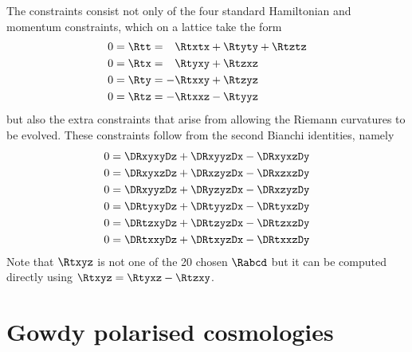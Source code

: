 \documentclass[a4paper,12pt]{article}
\numberwithin{equation}{section}
\begin{document}
The constraints consist not only of the four standard Hamiltonian and momentum constraints,
which on a lattice take the form
\begin{align}
0 &= \Rtt = \phantom{-} \Rtxtx + \Rtyty + \Rtztz\label{eqn:EinsConstA}\\
0 &= \Rtx = \phantom{-} \Rtyxy + \Rtzxz\label{eqn:EinsConstB}\\
0 &= \Rty = - \Rtxxy + \Rtzyz\label{eqn:EinsConstC}\\
0 &= \Rtz = - \Rtxxz - \Rtyyz\label{eqn:EinsConstD}
\end{align}
but also the extra constraints that arise from allowing the Riemann curvatures to be
evolved. These constraints follow from the second Bianchi identities, namely
\begin{align}
0 &= \DRxyxyDz + \DRxyyzDx - \DRxyxzDy\label{eqn:BianConstA}\\
0 &= \DRxyxzDz + \DRxzyzDx - \DRxzxzDy\label{eqn:BianConstB}\\
0 &= \DRxyyzDz + \DRyzyzDx - \DRxzyzDy\label{eqn:BianConstC}\\
0 &= \DRtyxyDz + \DRtyyzDx - \DRtyxzDy\label{eqn:BianConstE}\\
0 &= \DRtzxyDz + \DRtzyzDx - \DRtzxzDy\label{eqn:BianConstF}\\
0 &= \DRtxxyDz + \DRtxyzDx - \DRtxxzDy\label{eqn:BianConstD}
\end{align}
Note that $\Rtxyz$ is not one of the 20 chosen $\Rabcd$ but it can be computed directly using
$\Rtxyz=\Rtyxz-\Rtzxy$.

\section{Gowdy polarised cosmologies}
\label{sec:GowdyIntro}
\end{document}
